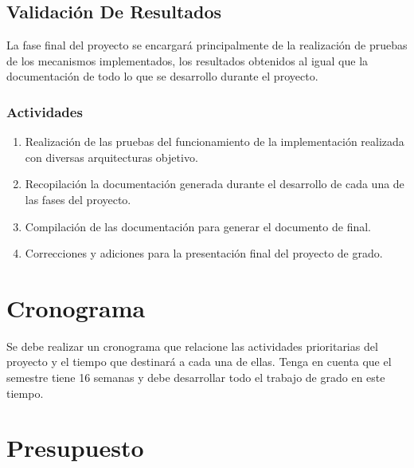 \documentclass[12pt]{article}
\begin{document}
    \subsection{Validación De Resultados}
    
    La fase final del proyecto se encargará principalmente de la realización de pruebas de los mecanismos implementados, los resultados obtenidos al igual que la documentación de todo lo que se desarrollo durante el proyecto.
    
    \subsubsection*{Actividades}
    
   \begin{enumerate}[label=\thesubsection.\arabic*., wide, labelindent=2em, leftmargin=5em]
        \item Realización de las pruebas del funcionamiento de la implementación realizada con diversas arquitecturas objetivo.
        \item Recopilación la documentación generada durante el desarrollo de cada una de las fases del proyecto.
        \item Compilación de las documentación para generar el documento de final.
        \item Correcciones y adiciones para la presentación final del proyecto de grado.
    \end{enumerate}  

    \section{Cronograma}

    Se debe realizar un cronograma que relacione las actividades prioritarias del proyecto y el tiempo que destinará a cada una de ellas. Tenga en cuenta que el semestre tiene 16 semanas y debe desarrollar todo el trabajo de grado en este tiempo. 

    \section{Presupuesto}
    
\end{document}
